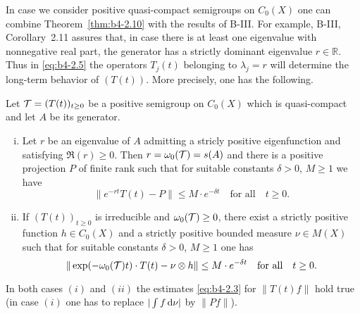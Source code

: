In case we consider positive quasi-compact semigroups on $C_{0}(X)$ one can combine Theorem~\ref{thm:b4-2.10} with the results of B-III. 
For example, B-III, Corollary~2.11 assures that, in case there is at least one eigenvalue with nonnegative real part, the generator has a strictly dominant eigenvalue $r \in \mathbb{R}$. 
Thus in \eqref{eq:b4-2.5} the operators $T_j(t)$ belonging to $\lambda_j = r$ will determine the long-term behavior of $(T(t))$. More precisely, one has the following.
\begin{corollary}\label{cor:b4-2.11}
	Let $\mathcal{T} = (T(t))_{t \geq 0}$ be a positive semigroup on $C_{0}(X)$ which is quasi-compact and let $A$ be its generator.
	\begin{enumerate}[(i)]
	\item	
	Let $r$ be an eigenvalue of $A$ admitting a stricly positive eigenfunction and satisfying $\Re(r) \geq 0$. 
    Then $r = \omega_{0}(\mathcal{T}) = s(A)$ and there is a positive projection $P$ of finite rank such that for
%
%
%
	suitable constants $\delta > 0$, $M \geq 1$ we have
	\begin{equation}\label{eq:b4-2.6}
		\|e^{-rt}T(t) - P\| \leq M \cdot e^{-\delta t} \quad \text{for all} \quad t \geq 0 \text{.}
	\end{equation}
	
	\item 
	If $(T(t))_{t \geq 0}$ is irreducible and $\omega_{0}(\mathcal{T}) \geq 0$, there exist a strictly positive function $h \in C_{0}(X)$ and a strictly positive bounded measure $\nu \in M(X)$ such that for suitable constants $\delta > 0$, $M \geq 1$ one has
	\begin{equation}\label{eq:b4-2.7}
		\|\exp(-\omega_{0}(\mathcal{T})t) \cdot T(t) - \nu \otimes h\| \leq M \cdot e^{-\delta t} \quad \text{for all} \quad t \geq 0 \text{.}
	\end{equation}
	\end{enumerate}
In both cases $(i)$ and $(ii)$ the estimates \eqref{eq:b4-2.3} for $\|T(t)f\|$ hold true (in case $(i)$ one has to replace $|\int f \mathop{}\!\mathrm{d}{\nu}|$ by $\|Pf\|$).
\end{corollary}
